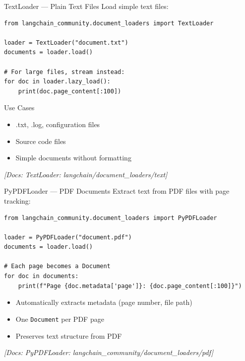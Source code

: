 \documentclass[aspectratio=169,11pt]{beamer}
\newcommand{\docref}[1]{{\scriptsize\color{docgray}[Docs: #1]}}
\begin{document}
\begin{frame}[fragile]{TextLoader --- Plain Text Files}
  Load simple text files:
  \begin{lstlisting}
from langchain_community.document_loaders import TextLoader

loader = TextLoader("document.txt")
documents = loader.load()

# For large files, stream instead:
for doc in loader.lazy_load():
    print(doc.page_content[:100])
  \end{lstlisting}

  \vspace{0.5cm}
  \begin{conceptbox}{Use Cases}
    \begin{itemize}
    \setlength{\itemsep}{1pt}
      \item .txt, .log, configuration files
      \item Source code files
      \item Simple documents without formatting
    \end{itemize}
  \end{conceptbox}

  \vspace{0.5cm}
  \textit{\docref{TextLoader: langchain/document\_loaders/text}}
\end{frame}

\begin{frame}[fragile]{PyPDFLoader --- PDF Documents}
  Extract text from PDF files with page tracking:
  \begin{lstlisting}
from langchain_community.document_loaders import PyPDFLoader

loader = PyPDFLoader("document.pdf")
documents = loader.load()

# Each page becomes a Document
for doc in documents:
    print(f"Page {doc.metadata['page']}: {doc.page_content[:100]}")
  \end{lstlisting}

  \vspace{0.5cm}
  \begin{itemize}
    \setlength{\itemsep}{1pt}
    \item Automatically extracts metadata (page number, file path)
    \item One \texttt{Document} per PDF page
    \item Preserves text structure from PDF
  \end{itemize}

  \textit{\docref{PyPDFLoader: langchain\_community/document\_loaders/pdf}}
\end{frame}
\end{document}
